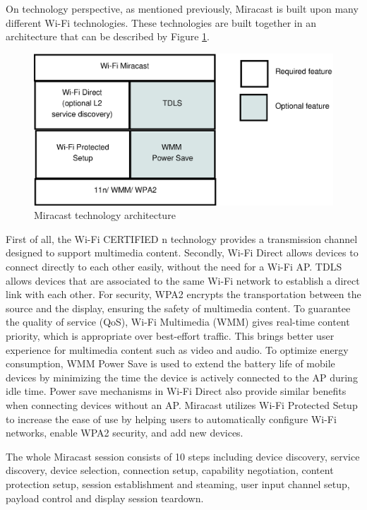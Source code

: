On technology perspective, as mentioned previously, Miracast is built upon
many different Wi-Fi technologies. These technologies are built together in an
architecture that can be described by Figure \ref{miracast_architect}.

\begin{figure}[htb] \centering 
\includegraphics[width=0.9\columnwidth]{charts/miracast_technology_architecture} 
\caption{Miracast technology architecture \label{miracast_architect}} 
\end{figure} 

First of all, the Wi-Fi CERTIFIED n technology provides a transmission channel
designed to support multimedia content. Secondly, Wi-Fi Direct allows devices to
connect directly to each other easily, without the need for a Wi-Fi AP. TDLS
allows devices that are associated to the same Wi-Fi network to establish a
direct link with each other. For security, WPA2 encrypts the transportation
between the source and the display, ensuring the safety of multimedia content.
To guarantee the quality of service (QoS), Wi-Fi Multimedia (WMM) gives real-time
content priority, which is appropriate over best-effort traffic. This brings
better user experience for multimedia content such as video and audio. To
optimize energy consumption, WMM Power Save is used to extend the battery life
of mobile devices by minimizing the time the device is actively connected to
the AP during idle time. Power save mechanisms in Wi-Fi Direct also provide
similar benefits when connecting devices without an AP. Miracast utilizes 
Wi-Fi Protected Setup to increase the ease of use by helping users to
automatically configure Wi-Fi networks, enable WPA2 security, and add new
devices.

The whole Miracast session consists of 10 steps including device discovery,
service discovery, device selection, connection setup, capability negotiation,
content protection setup, session establishment and steaming, user input
channel setup, payload control and display session teardown.

